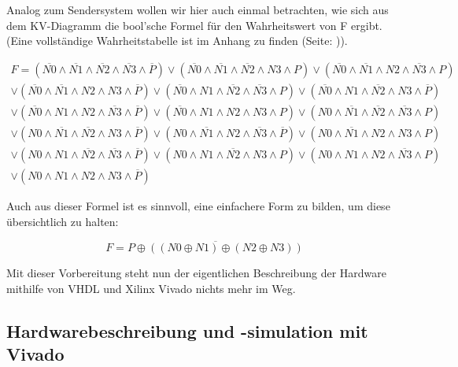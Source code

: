 \documentclass{article}
\begin{document}
Analog zum Sendersystem wollen wir hier auch einmal betrachten, wie sich aus dem KV-Diagramm die bool'sche Formel für den Wahrheitswert von F ergibt. (Eine vollständige Wahrheitstabelle ist im Anhang zu finden (Seite: \pageref{sec:anhang})).

\begin{align*}
 F = (\overline{N0} \wedge \overline{N1} \wedge \overline{N2} \wedge \overline{N3} \wedge \overline P) \vee (\overline{N0} \wedge \overline{N1} \wedge \overline{N2} \wedge N3\wedge P) \vee (\overline{N0} \wedge \overline{N1} \wedge N2 \wedge \overline{N3}\wedge P)\\ \vee (\overline{N0} \wedge \overline{N1} \wedge N2 \wedge N3\wedge \overline P)
 \vee (\overline{N0} \wedge N1 \wedge \overline{N2} \wedge \overline{N3} \wedge P) \vee (\overline{N0} \wedge N1 \wedge \overline{N2} \wedge N3 \wedge \overline P)\\ \vee (\overline{N0} \wedge N1 \wedge N2 \wedge \overline{N3}\wedge \overline P) \vee (\overline{N0} \wedge N1 \wedge N2 \wedge N3\wedge P)
 \vee (N0 \wedge \overline{N1} \wedge \overline{N2} \wedge \overline{N3} \wedge P)\\ \vee (N0 \wedge \overline{N1} \wedge \overline{N2} \wedge N3 \wedge \overline P) \vee (N0 \wedge \overline{N1} \wedge N2 \wedge \overline{N3} \wedge \overline P) \vee (N0 \wedge \overline{N1} \wedge N2 \wedge N3\wedge P)\\
 \vee (N0 \wedge N1 \wedge \overline{N2} \wedge \overline{N3} \wedge \overline P) \vee (N0 \wedge N1 \wedge \overline{N2} \wedge N3 \wedge P) \vee (N0 \wedge N1 \wedge N2 \wedge \overline{N3} \wedge P)\\ \vee(N0 \wedge N1 \wedge N2 \wedge N3\wedge \overline P)
\end{align*}

Auch aus dieser Formel ist es sinnvoll, eine einfachere Form zu bilden, um diese übersichtlich zu halten:

\begin{equation}
  \label{eq:2}
  F = \overline{P \oplus ((N0 \oplus N1) \oplus (N2 \oplus N3))}
\end{equation}

Mit dieser Vorbereitung steht nun der eigentlichen Beschreibung der Hardware mithilfe von VHDL und Xilinx Vivado nichts mehr im Weg.
\newpage

\subsection{Hardwarebeschreibung und -simulation mit Vivado}
\end{document}
